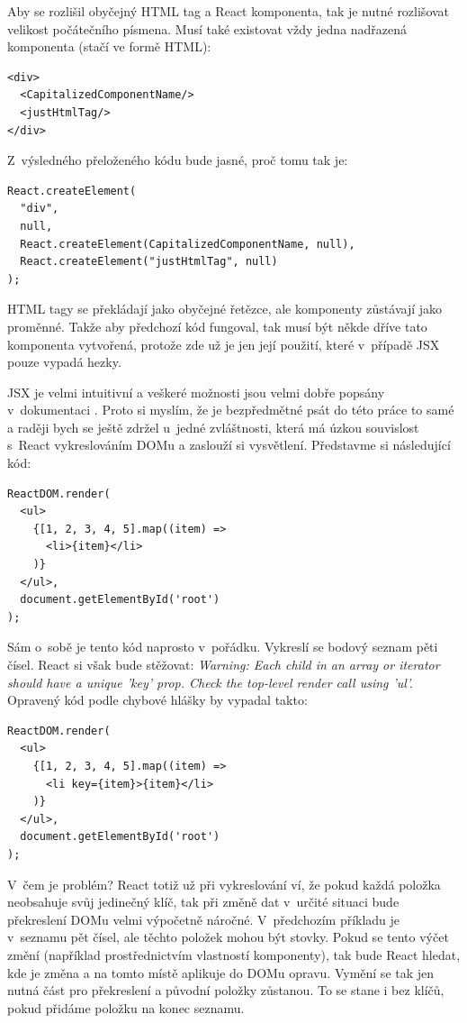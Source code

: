 Aby se rozlišil obyčejný HTML tag a React komponenta, tak je nutné rozlišovat velikost počátečního písmena. Musí také existovat vždy jedna nad\-řa\-ze\-ná komponenta (stačí ve formě HTML):

\begin{verbatim}
<div>
  <CapitalizedComponentName/>
  <justHtmlTag/>
</div>
\end{verbatim}
%
Z~výsledného přeloženého kódu bude jasné, proč tomu tak je:
%
\begin{verbatim}
React.createElement(
  "div",
  null,
  React.createElement(CapitalizedComponentName, null),
  React.createElement("justHtmlTag", null)
);
\end{verbatim}

HTML tagy se překládají jako obyčejné řetězce, ale komponenty zůstávají jako proměnné. Takže aby předchozí kód fungoval, tak musí být někde dříve tato komponenta vytvořená, protože zde už je jen její použití, které v~případě JSX pouze vypadá hezky.

JSX je velmi intuitivní a veškeré možnosti jsou velmi dobře popsány v~dokumentaci \cite{jsx}. Proto si myslím, že je bezpředmětné psát do této práce to samé a raději bych se ještě zdržel u~jedné zvláštnosti, která má úzkou souvislost s~React vykreslováním DOMu a zaslouží si vysvětlení. Představme si následující kód:

\begin{verbatim}
ReactDOM.render(
  <ul>
    {[1, 2, 3, 4, 5].map((item) =>
      <li>{item}</li>
    )}
  </ul>,
  document.getElementById('root')
);
\end{verbatim}

Sám o~sobě je tento kód naprosto v~pořádku. Vykreslí se bodový seznam pěti čísel. React si však bude stěžovat: \textit{Warning: Each child in an array or iterator should have a unique 'key' prop. Check the top-level render call using 'ul'.} Opravený kód podle chybové hlášky by vypadal takto:

\begin{verbatim}
ReactDOM.render(
  <ul>
    {[1, 2, 3, 4, 5].map((item) =>
      <li key={item}>{item}</li>
    )}
  </ul>,
  document.getElementById('root')
);
\end{verbatim}

V~čem je problém? React totiž už při vykreslování ví, že pokud každá položka neobsahuje svůj jedinečný klíč, tak při změně dat v~určité situaci bude překreslení DOMu velmi výpočetně náročné. V~předchozím příkladu je v~seznamu pět čísel, ale těchto položek mohou být stovky. Pokud se tento výčet změní (například prostřednictvím vlastností komponenty), tak bude React hledat, kde je změna a na tomto místě aplikuje do DOMu opravu. Vymění se tak jen nutná část pro překreslení a původní položky zůstanou. To se stane i bez klíčů, pokud přidáme položku na konec seznamu.

